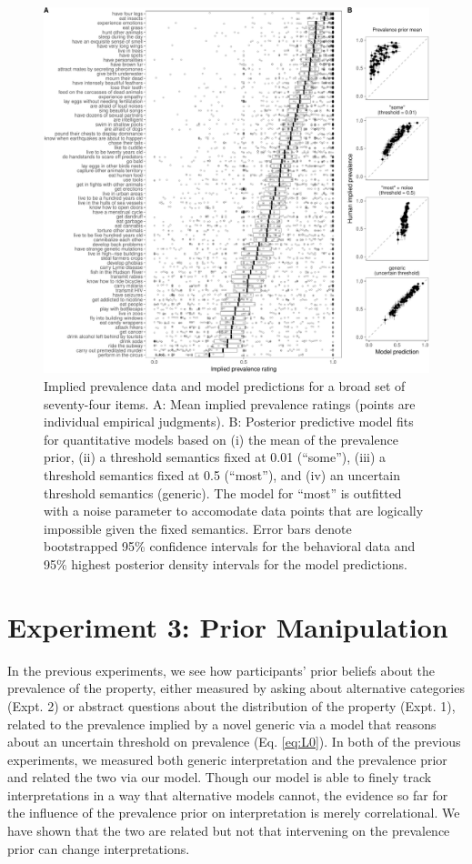 \documentclass[floatsintext,doc]{apa6}
\theoremstyle{definition}
\theoremstyle{definition}
\theoremstyle{definition}
\theoremstyle{remark}
\begin{document}
\begin{figure}
\centering
\includegraphics{genint_files/figure-latex/genint-modelingResults-1.pdf}
\caption{\label{fig:genint-modelingResults}Implied prevalence data and model
predictions for a broad set of seventy-four items. A: Mean implied
prevalence ratings (points are individual empirical judgments). B:
Posterior predictive model fits for quantitative models based on (i) the
mean of the prevalence prior, (ii) a threshold semantics fixed at 0.01
(\enquote{some}), (iii) a threshold semantics fixed at 0.5
(\enquote{most}), and (iv) an uncertain threshold semantics (generic).
The model for \enquote{most} is outfitted with a noise parameter to
accomodate data points that are logically impossible given the fixed
semantics. Error bars denote bootstrapped 95\% confidence intervals for
the behavioral data and 95\% highest posterior density intervals for the
model predictions.}
\end{figure}

\section{Experiment 3: Prior
Manipulation}\label{experiment-3-prior-manipulation}

In the previous experiments, we see how participants' prior beliefs
about the prevalence of the property, either measured by asking about
alternative categories (Expt. 2) or abstract questions about the
distribution of the property (Expt. 1), related to the prevalence
implied by a novel generic via a model that reasons about an uncertain
threshold on prevalence (Eq. \ref{eq:L0}). In both of the previous
experiments, we measured both generic interpretation and the prevalence
prior and related the two via our model. Though our model is able to
finely track interpretations in a way that alternative models cannot,
the evidence so far for the influence of the prevalence prior on
interpretation is merely correlational. We have shown that the two are
related but not that intervening on the prevalence prior can change
interpretations.
\end{document}
